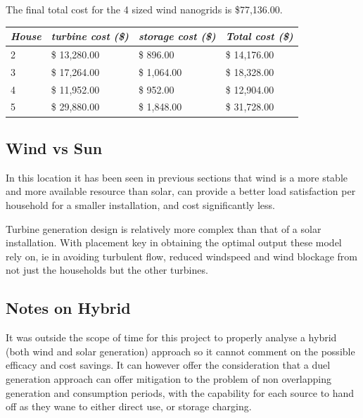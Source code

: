 \documentclass[journal]{IEEEtran}
\begin{document}
                The final total cost for the 4 sized wind nanogrids is \$77,136.00.
                \begin{table}[h!]
                        \begin{tabular}{|l|l|l|l|}
                        \hline
                        \textit{\textbf{House}} & \textit{\textbf{turbine cost (\$)}} & \textit{\textbf{storage cost (\$)}} & \textit{\textbf{Total cost (\$)}} \\ \hline
                        2                       & \$            13,280.00             & \$             896.00               & \$    14,176.00                   \\ \hline
                        3                       & \$            17,264.00             & \$          1,064.00                & \$    18,328.00                   \\ \hline
                        4                       & \$            11,952.00             & \$             952.00               & \$    12,904.00                   \\ \hline
                        5                       & \$            29,880.00             & \$          1,848.00                & \$    31,728.00                   \\ \hline
                        \end{tabular}
                        \end{table}
        \subsection{Wind vs Sun}
                        In this location it has been seen in previous sections that wind is a more stable and more available resource than solar, can provide a better load satisfaction per household for a smaller installation, and cost significantly less. 

                        Turbine generation design is relatively more complex than that of a solar installation. With placement key in obtaining the optimal output these model rely on, ie in avoiding turbulent flow, reduced windspeed and wind blockage from not just the households but the other turbines.  

        \subsection{Notes on Hybrid}
        It was outside the scope of time for this project to properly analyse a hybrid (both wind and solar generation) approach so it cannot comment on the possible efficacy and cost savings. It can however offer the consideration that a duel generation approach can offer mitigation to the problem of non overlapping generation and consumption periods, with the capability for each source to hand off as they wane to either direct use, or storage charging. 
\end{document}
